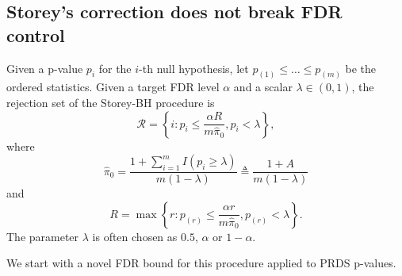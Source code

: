 

\subsection{Storey's correction does not break FDR control}\label{app:storey_BH}
 Given a p-value $p_i$ for the $i$-th null hypothesis, let $p_{(1)}\le \ldots \le p_{(m)}$ be the ordered statistics. Given a target FDR level $\alpha$ and a scalar $\lambda\in (0, 1)$, the rejection set of the Storey-BH procedure is
\[\mathcal{R} = \left\{i: p_i\le \frac{\alpha R}{m\hat{\pi}_0}, p_i < \lambda\right\},\]
where
\[\hat{\pi}_0 = \frac{1 + \sum_{i=1}^{m}I(p_i \ge \lambda)}{m (1 - \lambda)} \triangleq \frac{1 + A}{m(1 - \lambda)}\]
and
\[R = \max\left\{r: p_{(r)}\le \frac{\alpha r}{m\hat{\pi}_0}, p_{(r)} < \lambda\right\}.\]
The parameter $\lambda$ is often chosen as $0.5$, $\alpha$ or $1 - \alpha$.

We start with a novel FDR bound for this procedure applied to PRDS p-values.


